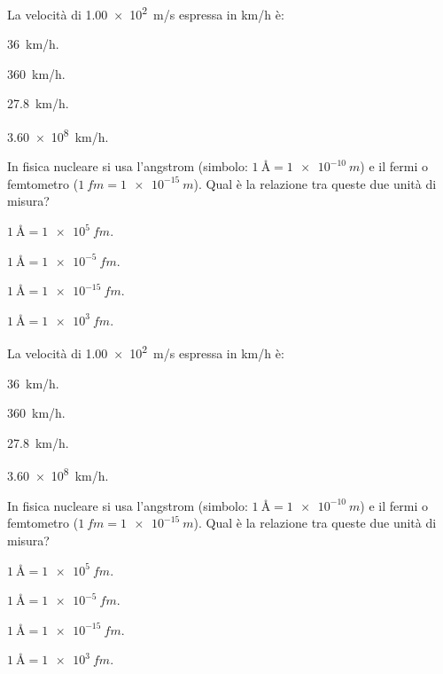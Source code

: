 \documentclass{article}
\begin{document}
\begin{enumext}[columns=2,save-ans=sabastiano]
 \item La velocità di \SI{1,00e2}{m/s} espressa in \si{km/h} è:
   \begin{keyans*}[save=rott]
     \item \SI{36}{km/h}.
     \item* \SI{360}{km/h}.
     \item \SI{27,8}{km/h}.
     \item \SI{3,60e8}{km/h}.
   \end{keyans*}

 \item In fisica nucleare si usa l'angstrom (simbolo:
 $\SI{1}{\angstrom} = \SI{1e-10}{m}$) e il fermi o femtometro
 ($\SI{1}{fm} = \SI{1e-15}{m}$). Qual è la relazione tra queste due
 unità di misura?
   \begin{keyans}
     \item* $\SI{1}{\angstrom}=\SI{1e5}{fm}$.
     \item $\SI{1}{\angstrom}=\SI{1e-5}{fm}$.
     \item $\SI{1}{\angstrom}=\SI{1e-15}{fm}$.
     \item $\SI{1}{\angstrom}=\SI{1e3}{fm}$.
   \end{keyans}

 \item La velocità di \SI{1,00e2}{m/s} espressa in \si{km/h} è:
   \begin{keyans}
     \item \SI{36}{km/h}.
     \item* \SI{360}{km/h}.
     \item \SI{27,8}{km/h}.
     \item \SI{3,60e8}{km/h}.
   \end{keyans}

 \item In fisica nucleare si usa l'angstrom (simbolo:
 $\SI{1}{\angstrom} = \SI{1e-10}{m}$) e il fermi o femtometro
 ($\SI{1}{fm} = \SI{1e-15}{m}$). Qual è la relazione tra queste due
 unità di misura?
   \begin{keyans}
     \item* $\SI{1}{\angstrom}=\SI{1e5}{fm}$.
     \item $\SI{1}{\angstrom}=\SI{1e-5}{fm}$.
     \item $\SI{1}{\angstrom}=\SI{1e-15}{fm}$.
     \item $\SI{1}{\angstrom}=\SI{1e3}{fm}$.
   \end{keyans}
\end{enumext}

\end{document}
